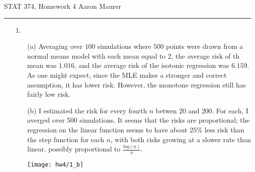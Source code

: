 \documentclass[11pt]{article}
\theoremstyle{definition}
\begin{document}
STAT 374, Homework 4 \hfill Aaron Maurer
\vspace{2mm}
\hrule
\vspace{2mm}
\begin{itemize} 
    \item[1.]
        \begin{itemize} 
            \item[(a)] Averaging over $100$ simulations where $500$ points
were drawn from a normal means model with each mean equal to $2$, the average
risk of th mean was $1.016$, and the average risk of the isotonic regression
was $6.159$. As one might expect, since the MLE makes a stronger and correct
assumption, it has lower risk. However, the monotone regression still has
fairly low risk.
            \item[(b)] I estimated the risk for every fourth $n$ betwen 20 and
200. For each, I averged over 500 simulations. It seems that the risks are
proportional; the regression on the linear function seems to have about $25\%$
less risk than the step function for each $n$, with both risks growing at a
slower rate than linear, possibly proportional to \(\frac{log(n)}{n}\).
                \begin{center}
                    \texttt{[image: hw4/1\_b]} 
                \end{center}



\end{itemize}
\end{itemize}
\end{document}
